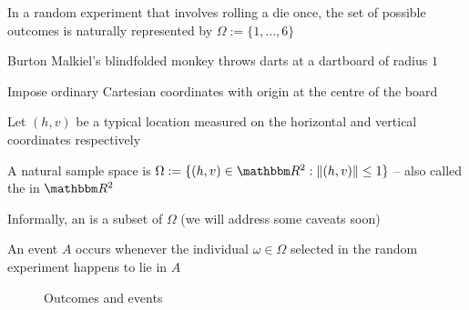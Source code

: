 \begin{frame}

    \vspace{2em}
    \Eg
    In a random experiment that involves rolling a die once, the set of
    possible outcomes is naturally represented by $\Omega := \{1,\ldots, 6\}$
    
    \vspace{1em}
    \Eg
    \label{eg:dart}
    Burton Malkiel's blindfolded monkey throws darts at a
    dartboard of radius $1$
    
    Impose ordinary
    Cartesian coordinates with origin at the centre of the board
    
    Let $(h,
    v)$ be a typical location measured on the horizontal and vertical
    coordinates respectively
    
    A natural sample space is $\Omega :=
    \setntn{(h, v) \in \RR^2}{\| (h, v) \| \leq 1}$ -- also called
    the  in $\RR^2$
    
\end{frame}

\begin{frame}

    \vspace{2em}
    Informally, an  is a subset of $\Omega$ (we will address some caveats soon)
    
    \vspace{1em}
    An event $A$
    occurs whenever the individual $\omega \in \Omega$ selected in the random
    experiment happens to lie in $A$
    
\end{frame}

\begin{frame}

    \vspace{2.5em}
    
    \begin{figure}
   \begin{center}
    \scalebox{.32}{}
    \caption{\label{f:eao} Outcomes and events}
   \end{center}
    \end{figure}

\end{frame}

